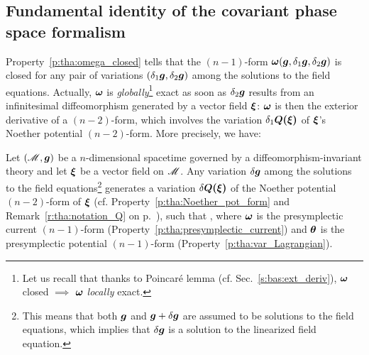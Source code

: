 \subsection{Fundamental identity of the covariant phase space formalism}

Property~\ref{p:tha:omega_closed} tells that the $(n-1)$-form
$\bm{\omega}(\bm{g},\delta_1\bm{g},\delta_2\bm{g})$ is closed for any pair
of variations $(\delta_1\bm{g},\delta_2\bm{g})$ among the solutions to the field equations.
Actually, $\bm{\omega}$ is
\emph{globally}\footnote{Let us recall that thanks to Poincaré lemma (cf. Sec.~\ref{s:bas:ext_deriv}),
$\bm{\omega}$ closed $\implies$ $\bm{\omega}$ \emph{locally} exact.} exact as soon as
$\delta_2\bm{g}$ results from an infinitesimal diffeomorphism
generated by a vector field $\bm{\xi}$:  $\bm{\omega}$ is then the exterior derivative
of a $(n-2)$-form, which involves the variation $\delta_1 \bm{Q}\textbf{(}\bm{\xi}\textbf{)}$
of $\bm{\xi}$'s Noether potential $(n-2)$-form. More precisely, we have:

\begin{prop}
Let $(\mathscr{M},\bm{g})$ be a $n$-dimensional spacetime governed by a
diffeomorphism-invariant theory and let $\bm{\xi}$ be a vector field on $\mathscr{M}$.
Any variation $\delta\bm{g}$ among the solutions to the field equations\footnote{This means
that both $\bm{g}$ and $\bm{g}+\delta\bm{g}$ are assumed to be
solutions to the field equations, which
implies that $\delta\bm{g}$ is a solution to the linearized field equation.}
generates a variation $\delta\bm{Q}\textbf{(}\bm{\xi}\textbf{)}$ of the
Noether potential $(n-2)$-form of $\bm{\xi}$ (cf. Property~\ref{p:tha:Noether_pot_form}
and Remark~\ref{r:tha:notation_Q} on p.~\pageref{r:tha:notation_Q}),
such that
\be \label{e:tha:fund_identity}
    ,
\ee
where $\bm{\omega}$ is the presymplectic current $(n-1)$-form (Property~\ref{p:tha:presymplectic_current}) and $\bm{\theta}$ is
the presymplectic potential $(n-1)$-form (Property~\ref{p:tha:var_Lagrangian}).
\end{prop}

